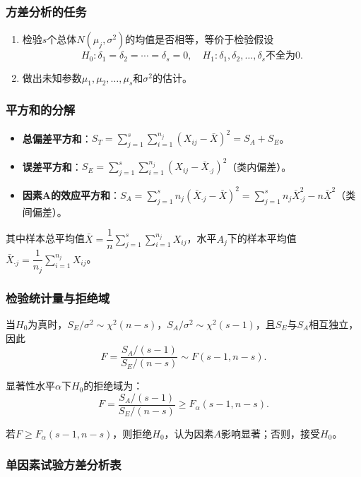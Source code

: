 \documentclass[11pt,a4paper]{report}
\theoremstyle{definition}
\theoremstyle{plain}
\begin{document}
\subsubsection{方差分析的任务}

\begin{enumerate}[label=\arabic*.,leftmargin=2em]
    \item 检验$s$个总体$N(\mu_j,\sigma^2)$的均值是否相等，等价于检验假设
    \[
    H_0:\delta_1=\delta_2=\cdots=\delta_s=0,\quad H_1:\delta_1,\delta_2,\ldots,\delta_s\text{不全为}0.
    \]
    \item 做出未知参数$\mu_1,\mu_2,\ldots,\mu_s$和$\sigma^2$的估计。
\end{enumerate}

\subsubsection{平方和的分解}

\begin{itemize}[leftmargin=2em]
    \item \textbf{总偏差平方和}：$S_T=\sum_{j=1}^{s}\sum_{i=1}^{n_j}(X_{ij}-\bar{X})^2=S_A+S_E$。
    \item \textbf{误差平方和}：$S_E=\sum_{j=1}^{s}\sum_{i=1}^{n_j}(X_{ij}-\bar{X}_{\cdot j})^2$（类内偏差）。
    \item \textbf{因素A的效应平方和}：$S_A=\sum_{j=1}^{s}n_j(\bar{X}_{\cdot j}-\bar{X})^2=\sum_{j=1}^{s}n_j\bar{X}_{\cdot j}^2-n\bar{X}^2$（类间偏差）。
\end{itemize}

其中样本总平均值$\bar{X}=\dfrac{1}{n}\sum_{j=1}^{s}\sum_{i=1}^{n_j}X_{ij}$，水平$A_j$下的样本平均值$\bar{X}_{\cdot j}=\dfrac{1}{n_j}\sum_{i=1}^{n_j}X_{ij}$。

\subsubsection{检验统计量与拒绝域}

当$H_0$为真时，$S_E/\sigma^2\sim\chi^2(n-s)$，$S_A/\sigma^2\sim\chi^2(s-1)$，且$S_E$与$S_A$相互独立，因此
\[
F=\frac{S_A/(s-1)}{S_E/(n-s)}\sim F(s-1,n-s).
\]

显著性水平$\alpha$下$H_0$的拒绝域为：
\[
F=\frac{S_A/(s-1)}{S_E/(n-s)}\geq F_\alpha(s-1,n-s).
\]

若$F\geq F_\alpha(s-1,n-s)$，则拒绝$H_0$，认为因素$A$影响显著；否则，接受$H_0$。

\subsubsection{单因素试验方差分析表}
\end{document}
